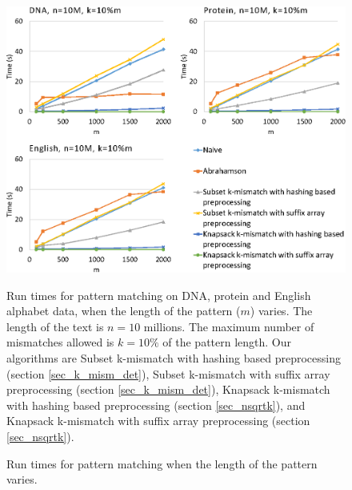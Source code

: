 \begin{figure}
\caption{Run times for pattern matching when the length of the pattern
varies.}
\includegraphics{fig2.eps}

Run times for pattern matching on DNA, protein and
English alphabet data, when the length of the pattern ($m$) varies.
The length of the text is $n = 10$ millions. The maximum number of
mismatches allowed is $k=10\%$ of the pattern length.
Our algorithms are Subset
k-mismatch with hashing based preprocessing (section
\ref{sec_k_mism_det}), Subset k-mismatch with suffix array preprocessing (section \ref{sec_k_mism_det}),
Knapsack k-mismatch with hashing based preprocessing (section
\ref{sec_nsqrtk}), and Knapsack k-mismatch with suffix array preprocessing (section
\ref{sec_nsqrtk}).
\label{fig_runtimes_varym} 
\end{figure}




